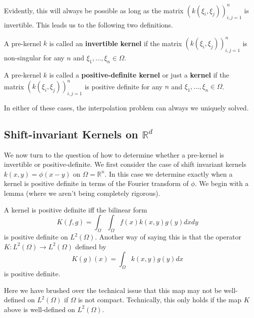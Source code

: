 Evidently, this will always be possible as long as the matrix $(k(\xi_i,\xi_j))^n_{i,j = 1}$ is invertible. This leads us to the following two definitions.
\begin{definition}
 A pre-kernel $k$ is called an \textbf{invertible kernel} if the matrix $(k(\xi_i,\xi_j))^n_{i,j = 1}$ is non-singular for any $n$ and $\xi_1,...,\xi_n\in \Omega$.
\end{definition}
\begin{definition}
 A pre-kernel $k$ is called a \textbf{positive-definite kernel} or just a \textbf{kernel} if the matrix $(k(\xi_i,\xi_j))^n_{i,j = 1}$ is positive definite for any $n$ and $\xi_1,...,\xi_n\in \Omega$.
\end{definition}

In either of these cases, the interpolation problem can always we uniquely solved.

\subsection{Shift-invariant Kernels on $\mathbb{R}^d$}
We now turn to the question of how to determine whether a pre-kernel is invertible or positive-definite. We first consider the case of shift invariant kernels $k(x,y) = \phi(x-y)$ on $\Omega = \mathbb{R}^n$. In this case we determine exactly when a kernel is positive definite in terms of the Fourier transform of $\phi$. We begin with a lemma (where we aren't being completely rigorous).

\begin{lemma}
 A kernel is positive definite iff the bilinear form
 \begin{equation}
  K(f,g) = \int_\Omega\int_\Omega f(x)k(x,y)g(y)dxdy
 \end{equation}
 is positive definite on $L^2(\Omega)$. Another way of saying this is that the operator $K:L^2(\Omega)\rightarrow L^2(\Omega)$ defined by
 \begin{equation}
  K(g)(x) = \int_\Omega k(x,y)g(y)dx
 \end{equation}
 is positive definite.

\end{lemma}
Here we have brushed over the technical issue that this map may not be well-defined on $L^2(\Omega)$ if $\Omega$ is not compact. Technically, this only holds if the map $K$ above is well-defined on $L^2(\Omega)$.

